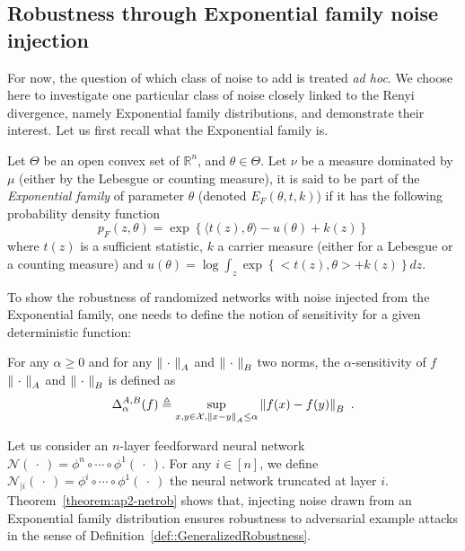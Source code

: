 \subsection{Robustness through Exponential family noise injection}

For now, the question of which class of noise to add is treated \textit{ad hoc}.
We choose here to investigate one particular class of noise closely linked to the Renyi divergence, namely Exponential family distributions, and demonstrate their interest.
Let us first recall what the Exponential family is.

\begin{definition}
  Let $\Theta$ be an open convex set of $\mathbb{R}^{n}$, and $\theta \in \Theta$.
  Let $\nu$ be a measure dominated by $\mu$ (either by the Lebesgue or counting measure), it is said to be part of the \emph{Exponential family} of parameter $\theta$ (denoted $E_{F}(\theta,t,k)$) if it has the following probability density function 
  \begin{equation}
    p_{F}(z,\theta)=\exp\left\{ \langle t(z),\theta \rangle -u(\theta) +k(z) \right\}
  \end{equation}
  where $t(z)$ is a sufficient statistic, $k$ a carrier measure (either for a Lebesgue or a counting measure) and $u(\theta) = \log \int_{z} \exp\left\{ <t(z),\theta> +k(z) \right\} dz $.
\end{definition}

To show the robustness of randomized networks with noise injected from the Exponential family, one needs to define the notion of sensitivity for a given deterministic function:
\begin{definition}
  For any $\alpha\geq0$ and for any $\norm{\ \cdot\ }_A$ and $\norm{\ \cdot\ }_B$ two norms, the $\alpha$-sensitivity of $f$ \wrt $\norm{\ \cdot\ }_A$ and $\norm{\ \cdot\ }_B$ is defined as
  \begin{equation}
    \Delta^{A,B}_\alpha(f) \triangleq \sup\limits_{ x,y \in \mathcal{X}, \norm{x-y}_{A} \leq \alpha} \norm{f(x) - f(y)}_B \enspace.
  \end{equation}
\end{definition}

Let us consider an  $n$-layer feedforward neural network  $\mathcal{N}(\ \cdot\ ) = \phi^n \circ \cdots \circ \phi^1(\ \cdot\ )$.
For any $i\in\left[n\right]$, we define $\mathcal{N}_{|i}(\ \cdot\ ) = \phi^i\circ \cdots \circ \phi^1(\ \cdot\ )$ the neural network truncated at layer $i$.
Theorem~\ref{theorem:ap2-netrob} shows that, injecting noise drawn from an Exponential family distribution ensures robustness to adversarial example attacks in the sense of Definition~\ref{def::GeneralizedRobustness}.



